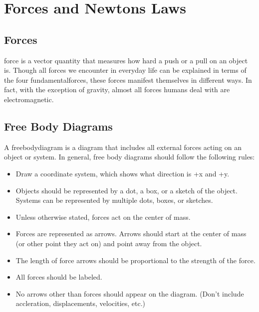 \chapter{Forces and Newtons Laws} 
\section{Forces}
\gls{force} is a vector quantity that measures how hard a push or a pull on an object is.  Though all forces we encounter in everyday life can be explained in terms of the four \gls{fundamentalforces}, these forces manifest themselves in different ways.  In fact, with the exception of gravity, almost all forces humans deal with are electromagnetic.  

 \section{Free Body Diagrams}
A \gls{freebodydiagram} is a diagram that includes all external forces acting on an object or system.  In general, free body diagrams should follow the following rules:
\begin{itemize}
	\item Draw a coordinate system, which shows what direction is +x and +y.
	\item Objects should be represented by a dot, a box, or a sketch of the object.  Systems can be represented by multiple dots, boxes, or sketches.  
	\item Unless otherwise stated, forces act on the center of mass.
	\item Forces are represented as arrows.  Arrows should start at the center of mass (or other point they act on) and point away from the object.  
	\item The length of force arrows should be proportional to the strength of the force.
	\item All forces should be labeled.
	\item No arrows other than forces should appear on the diagram.  (Don't include accleration, displacements, velocities, etc.) 	
\end{itemize}
\newpage

